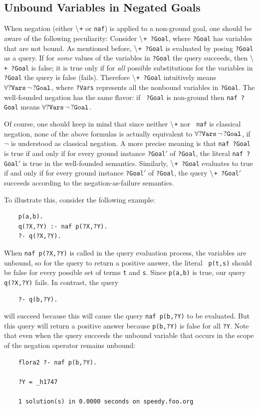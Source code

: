 \documentclass[11pt]{article}
\newcommand{\PLGNAF}{\mbox{\tt \ensuremath{\tt\backslash}+}\xspace}
\newcommand{\SILKNAF}{{{\tt naf}}\xspace}
\begin{document}
\subsection{Unbound Variables in Negated Goals}

When negation (either \PLGNAF or \SILKNAF) is applied to a non-ground goal, one
should be aware of the following peculiarity: Consider {\tt \PLGNAF\ ?Goal},
where {\tt ?Goal} has variables that are not bound. As mentioned before,
{\tt \PLGNAF\ ?Goal} is evaluated by posing {\tt ?Goal} as a query. If for
\emph{some} values of the variables in {\tt ?Goal} the query succeeds,
then {\tt \PLGNAF\ ?Goal} is false; it is true only if for \emph{all} possible
substitutions for the variables in {\tt ?Goal} the query is false
(fails). Therefore {\tt \PLGNAF\ ?Goal} intuitively means $\tt\forall
?Vars\,\neg\,?Goal$, where {\tt ?Vars} represents all the nonbound variables
in {\tt ?Goal}. The well-founded negation has the same flavor: if {\tt
  ?Goal} is non-ground then {\tt \SILKNAF\ ?Goal} means $\tt\forall
?Vars\,\neg\,?Goal$.

Of course, one should keep in mind that since neither {\tt \PLGNAF} nor {\tt
  \SILKNAF} is classical negation, none of the above formulas is actually
equivalent to $\tt\forall ?Vars\,\neg\,?Goal$, if $\neg$ is understood as
classical negation. A more precise meaning is that {\tt \SILKNAF\ ?Goal} is true
if and only if for every ground instance {\tt ?Goal$'$} of
{\tt ?Goal}, the literal {\tt \SILKNAF\ ?Goal$'$} is true in
the well-founded semantics.
Similarly, {\tt \PLGNAF\ ?Goal} evaluates to true if and
only if for every ground instance {\tt ?Goal$'$} of  {\tt ?Goal},  the query
{\tt \PLGNAF\ ?Goal$'$} succeeds according to the negation-as-failure
semantics.

To illustrate this, consider the following example:
\begin{verbatim}
    p(a,b).
    q(?X,?Y) :- naf p(?X,?Y).
    ?- q(?X,?Y).
\end{verbatim}
When {\tt naf p(?X,?Y)} is called in the query evaluation process, the variables
are unbound, so for the query to return a positive answer, the literal {\tt
  p(t,s)} should be false for every possible set of terms {\tt t} and {\tt s}.
Since {\tt p(a,b)} is true, our query {\tt q(?X,?Y)} fails. In contrast, the
query
\begin{verbatim}
    ?- q(b,?Y).  
\end{verbatim}
will succeed because this will cause the query {\tt naf p(b,?Y)} to be
evaluated. But this query will return a positive answer because {\tt p(b,?Y)}
is false for all {\tt ?Y}. Note that even when the query succeeds the
unbound variable that occurs in the scope of the negation operator remains
unbound:
\begin{verbatim}
    flora2 ?- naf p(b,?Y).  
 
    ?Y = _h1747
 
    1 solution(s) in 0.0000 seconds on speedy.foo.org
\end{verbatim}
\end{document}
